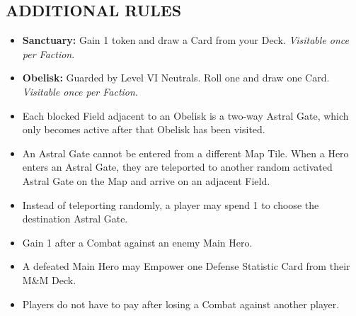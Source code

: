 \begin{multicols}{2}

\subsection*{\MakeUppercase{Additional Rules}}
\begin{itemize}
  \item \textbf{Sanctuary:} Gain 1  token and draw a Card from your Deck. \textit{Visitable once per Faction}.
  \item \textbf{Obelisk:} Guarded by Level VI Neutrals. Roll one  and draw one Card. \textit{Visitable once per Faction}.
  \item Each blocked Field adjacent to an Obelisk is a two-way Astral Gate, which only becomes active after that Obelisk has been visited.
  \item An Astral Gate cannot be entered from a different Map Tile. When a Hero enters an Astral Gate, they are teleported to another random activated Astral Gate on the Map and arrive on an adjacent Field.
  \item Instead of teleporting randomly, a player may spend 1  to choose the destination Astral Gate.
  \item Gain 1  after a Combat against an enemy Main Hero.
  \item A defeated Main Hero may Empower one Defense Statistic Card from their M\&M Deck.
  \item Players do not have to pay  after losing a Combat against another player.
\end{itemize}

\end{multicols}

